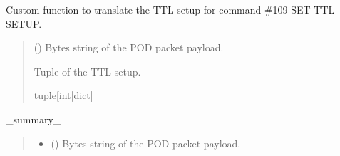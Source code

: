 \documentclass[letterpaper,10pt,english]{sphinxmanual}
\begin{document}
\begin{fulllineitems}
\begin{fulllineitems}
\label{\detokenize{PodApi.Devices:PodApi.Devices.PodDevice_8480SC.Pod8480SC._Custom109SETTTLSETUP}}
\pysigstartsignatures
{}
\pysigstopsignatures
\sphinxAtStartPar
Custom function to translate the TTL setup for command \#109 SET TTL SETUP.
\begin{quote}\begin{description}
\sphinxAtStartPar
{} () \textendash{} Bytes string of the POD packet payload.

\sphinxAtStartPar
Tuple of the TTL setup.

\sphinxAtStartPar
tuple{[}int|dict{]}

\end{description}\end{quote}

\end{fulllineitems}


\begin{fulllineitems}
\label{\detokenize{PodApi.Devices:PodApi.Devices.PodDevice_8480SC.Pod8480SC._CustomSTIMULUS}}
\pysigstartsignatures
{}
\pysigstopsignatures
\sphinxAtStartPar
\_summary\_
\begin{quote}\begin{description}
\begin{itemize}
\item {} 
\sphinxAtStartPar
{} () \textendash{} Bytes string of the POD packet payload.


\end{itemize}
\end{description}
\end{quote}
\end{fulllineitems}
\end{fulllineitems}
\end{document}
